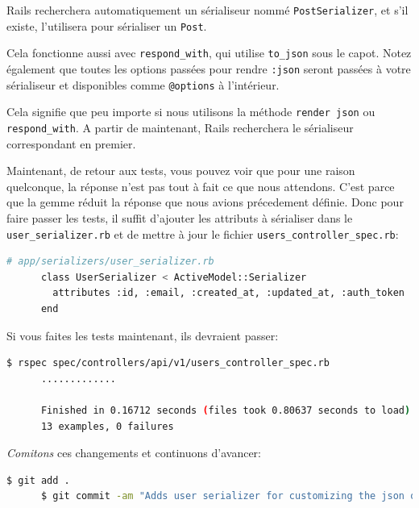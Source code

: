 \documentclass[]{report}
\begin{document}
    \begin{displayquote}
      Rails recherchera automatiquement un sérialiseur nommé \verb|PostSerializer|, et s'il existe, l'utilisera pour sérialiser un \verb|Post|.

      Cela fonctionne aussi avec \verb|respond_with|, qui utilise \verb|to_json| sous le capot. Notez également que toutes les options passées pour rendre \verb|:json| seront passées à votre sérialiseur et disponibles comme \verb|@options| à l'intérieur.

      Cela signifie que peu importe si nous utilisons la méthode \verb|render json| ou \verb|respond_with|. A partir de maintenant, Rails recherchera le sérialiseur correspondant en premier.
    \end{displayquote}

    Maintenant, de retour aux tests, vous pouvez voir que pour une raison quelconque, la réponse n'est pas tout à fait ce que nous attendons. C'est parce que la gemme réduit la réponse que nous avions précedement définie. Donc pour faire passer les tests, il suffit d'ajouter les attributs à sérialiser dans le \verb|user_serializer.rb| et de mettre à jour le fichier \verb|users_controller_spec.rb|:

    \begin{scriptsize}
      \begin{lstlisting}[language=bash]
      # app/serializers/user_serializer.rb
      class UserSerializer < ActiveModel::Serializer
        attributes :id, :email, :created_at, :updated_at, :auth_token
      end
      \end{lstlisting}
    \end{scriptsize}

    Si vous faites les tests maintenant, ils devraient passer:

    \begin{scriptsize}
      \begin{lstlisting}[language=bash]
      $ rspec spec/controllers/api/v1/users_controller_spec.rb
      .............

      Finished in 0.16712 seconds (files took 0.80637 seconds to load)
      13 examples, 0 failures
      \end{lstlisting}
    \end{scriptsize}

    \textit{Comitons} ces changements et continuons d'avancer:

    \begin{scriptsize}
      \begin{lstlisting}[language=bash]
      $ git add .
      $ git commit -am "Adds user serializer for customizing the json output"
      \end{lstlisting}
    \end{scriptsize}
\end{document}

